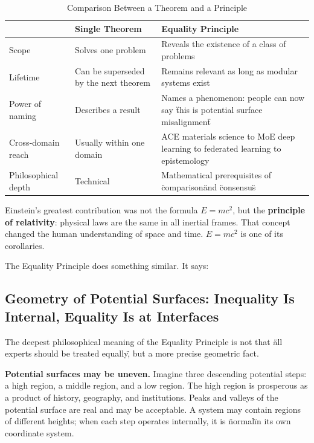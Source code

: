 \documentclass[12pt,a4paper]{article}
\theoremstyle{remark}
\begin{document}
\begin{table}[H]
\centering
\caption{Comparison Between a Theorem and a Principle}
\begin{tabular}{p{4cm} p{5cm} p{5cm}}
\toprule
& \textbf{Single Theorem} & \textbf{Equality Principle} \\
\midrule
Scope & Solves one problem & Reveals the existence of a class of problems \\
Lifetime & Can be superseded by the next theorem & Remains relevant as long as modular systems exist \\
Power of naming & Describes a result & Names a phenomenon: people can now say \"this is potential surface misalignment\" \\
Cross-domain reach & Usually within one domain & ACE materials science to MoE deep learning to federated learning to epistemology \\
Philosophical depth & Technical & Mathematical prerequisites of \"comparison\" and \"consensus\" \\
\bottomrule
\end{tabular}
\end{table}

Einstein's greatest contribution was not the formula $E=mc^2$, but the \textbf{principle of relativity}: physical laws are the same in all inertial frames. That concept changed the human understanding of space and time. $E=mc^2$ is one of its corollaries.

The Equality Principle does something similar. It says:

\begin{center}
\end{center}

\subsection{Geometry of Potential Surfaces: Inequality Is Internal, Equality Is at Interfaces}

The deepest philosophical meaning of the Equality Principle is not that \"all experts should be treated equally\", but a more precise geometric fact.

\textbf{Potential surfaces may be uneven.} Imagine three descending potential steps: a high region, a middle region, and a low region. The high region is prosperous as a product of history, geography, and institutions. Peaks and valleys of the potential surface are real and may be acceptable. A system may contain regions of different heights; when each step operates internally, it is \"normal\" in its own coordinate system.
\end{document}
